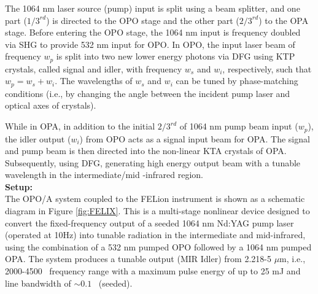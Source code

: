 The 1064 nm laser source (pump) input is split using a beam splitter, and one part ($1/3^{rd}$) is directed to the OPO 
stage and the other part ($2/3^{rd}$) to the OPA stage. Before entering the OPO stage, the 1064 nm input is frequency 
doubled via SHG to provide 532 nm input for OPO. In OPO, the input laser beam of frequency $w_p$ is split into two new 
lower energy photons via DFG using KTP crystals, called signal and idler, with frequency $w_s$ and $w_i$, respectively, 
such that $w_p = w_s + w_i$. The wavelengths of $w_s$ and $w_i$ can be tuned by phase-matching conditions (i.e., by 
changing the angle between the incident pump laser and optical axes of crystals). 

While in OPA, in addition to the initial $2/3^{rd}$ of 1064 nm pump beam input ($w_p$), 
the idler output ($w_i$) from OPO acts as a signal input beam for OPA. The signal and pump beam is then directed into
the non-linear KTA crystals of OPA. Subsequently, using DFG, generating high energy output beam 
with a tunable wavelength in the intermediate/mid -infrared region.\\

\textbf{Setup:}\\
The OPO/A system coupled to the FELion instrument is shown as a schematic diagram in Figure \ref{fig:FELIX}. This is a multi-stage nonlinear device designed to convert the fixed-frequency output of a seeded 1064 nm Nd:YAG pump laser (operated at 10Hz) into tunable radiation in the intermediate and mid-infrared, using the combination of a 532 nm pumped OPO followed by a 1064 nm pumped OPA. The system produces a tunable output (MIR Idler) from 2.218-5 $\mu$m, i.e., 2000-4500 \wn\ frequency range with a maximum pulse energy of up to 25 mJ and line bandwidth of $\sim 0.1$ \wn\ (seeded).

